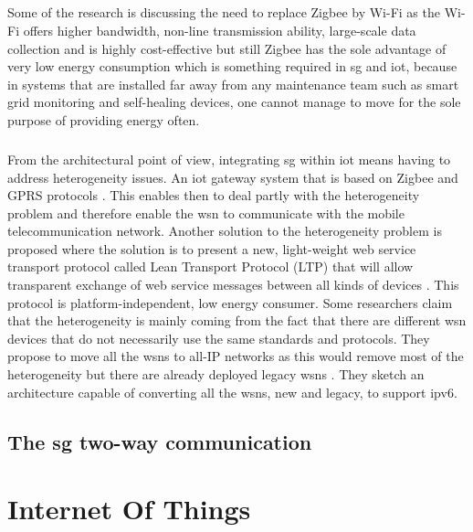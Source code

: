 \documentclass[oneside,12pt,a4paper,final]{book}
\begin{document}
\paragraph{}
Some of the research is discussing the need to replace Zigbee by Wi-Fi as the Wi-Fi offers higher bandwidth, non-line transmission ability, large-scale data collection and is highly cost-effective \cite{ref10} but still Zigbee has the sole advantage of very low energy consumption which is something required in \gls{sg} and \gls{iot}, because in systems that are installed far away from any maintenance team such as smart grid monitoring and self-healing devices, one cannot manage to move for the sole purpose of providing energy often. 
\paragraph{}
From the architectural point of view, integrating \gls{sg} within \gls{iot} means having to address heterogeneity issues. An \gls{iot} gateway system that is based on Zigbee and GPRS protocols \cite{ref11}. This enables then to deal partly with the heterogeneity problem and therefore enable the \gls{wsn} to communicate with the mobile telecommunication network. Another solution to the heterogeneity problem is proposed where the solution is to present a new, light-weight web service transport protocol called Lean Transport Protocol (LTP) that will allow transparent exchange of web service messages between all kinds of devices \cite{ref12}. This protocol is platform-independent, low energy consumer. Some researchers claim that the heterogeneity is mainly coming from the fact that there are different \gls{wsn} devices that do not necessarily use the same standards and protocols. They propose to move all the \glspl{wsn} to all-IP networks as this would remove most of the heterogeneity but there are already deployed legacy \glspl{wsn} \cite{ref13}. They sketch an architecture capable of converting all the \glspl{wsn}, new and legacy, to support \gls{ipv6}.
\section{The \gls{sg} two-way communication}
\paragraph{}

\chapter{Internet Of Things}
\end{document}

